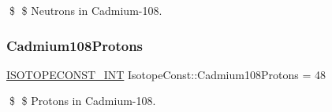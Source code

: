 \$ \$ Neutrons in Cadmium-\/108. \mbox{\label{group___isotope_const-_cadmium-_cd108_ga32384b59836e8aa7c946db3622524950}} 
\subsubsection{\texorpdfstring{Cadmium108\+Protons}{Cadmium108Protons}}
{\footnotesize\ttfamily \mbox{\hyperlink{group___isotope_const-_macros_ga5f18360b3e99483a35c32d789e62621c}{I\+S\+O\+T\+O\+P\+E\+C\+O\+N\+S\+T\+\_\+\+I\+NT}} Isotope\+Const\+::\+Cadmium108\+Protons = 48}

\$ \$ Protons in Cadmium-\/108. 